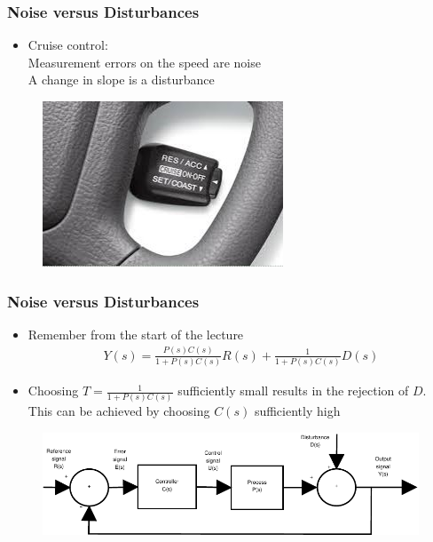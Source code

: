 \begin{frame}
	\frametitle{Noise versus Disturbances}
	\begin{itemize}
		\item Cruise control: \\
		Measurement errors on the speed are noise \\
		A change in slope is a disturbance
	\end{itemize}
	\begin{figure}
\centering
\includegraphics[width=0.7\linewidth]{"cruise control"}
\label{fig:cruisecontrol}
\end{figure}
\end{frame}

\begin{frame}
	\frametitle{Noise versus Disturbances}
	\begin{itemize}
		\item Remember from the start of the lecture
		\begin{align*}
			Y(s) = \frac{P(s)C(s)}{1+P(s)C(s)}R(s) + \frac{1}{1+P(s)C(s)}D(s)
		\end{align*}
		\item Choosing $T=\frac{1}{1+P(s)C(s)}$ sufficiently small results in the rejection of $D$. This can be achieved by choosing $C(s)$ sufficiently high
	\end{itemize}
	\begin{figure}
\centering
\includegraphics[width=0.7\linewidth]{Closed-Loop}
\label{fig:Closed-Loop4}
\end{figure}
\end{frame}


